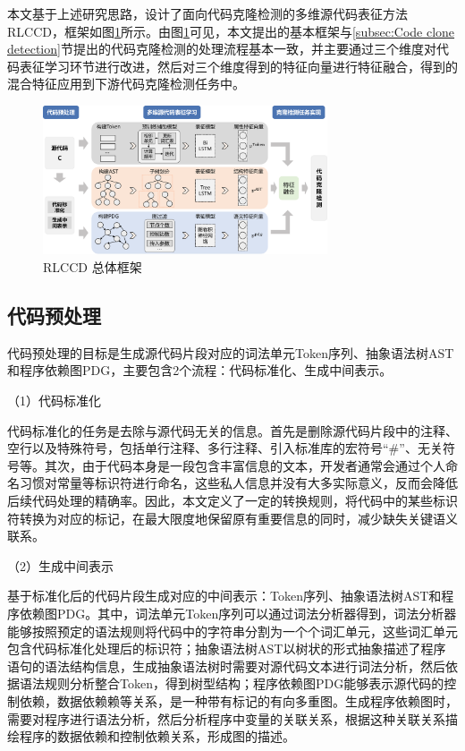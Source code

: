 本文基于上述研究思路，设计了面向代码克隆检测的多维源代码表征方法RLCCD，框架如图\ref{fig:framework}所示。由图\ref{fig:framework}可见，本文提出的基本框架与\ref{subsec:Code clone detection}节提出的代码克隆检测的处理流程基本一致，并主要通过三个维度对代码表征学习环节进行改进，然后对三个维度得到的特征向量进行特征融合，得到的混合特征应用到下游代码克隆检测任务中。

\begin{figure}[H]
    \centering
    \includegraphics[width=0.75\textwidth]{figures/framework}
    \caption{RLCCD 总体框架}
    \label{fig:framework}
\end{figure}

\subsection{代码预处理}
\label{subsec:Preprocess}
代码预处理的目标是生成源代码片段对应的词法单元Token序列、抽象语法树AST和程序依赖图PDG，主要包含2个流程：代码标准化、生成中间表示。

（1）代码标准化

代码标准化的任务是去除与源代码无关的信息。首先是删除源代码片段中的注释、空行以及特殊符号，包括单行注释、多行注释、引入标准库的宏符号“\#”、无关符号等。其次，由于代码本身是一段包含丰富信息的文本，开发者通常会通过个人命名习惯对常量等标识符进行命名，这些私人信息并没有大多实际意义，反而会降低后续代码处理的精确率。因此，本文定义了一定的转换规则，将代码中的某些标识符转换为对应的标记，在最大限度地保留原有重要信息的同时，减少缺失关键语义联系。

（2）生成中间表示

基于标准化后的代码片段生成对应的中间表示：Token序列、抽象语法树AST和程序依赖图PDG。其中，词法单元Token序列可以通过词法分析器得到，词法分析器能够按照预定的语法规则将代码中的字符串分割为一个个词汇单元，这些词汇单元包含代码标准化处理后的标识符；抽象语法树AST以树状的形式抽象描述了程序语句的语法结构信息，生成抽象语法树时需要对源代码文本进行词法分析，然后依据语法规则分析整合Token，得到树型结构；程序依赖图PDG能够表示源代码的控制依赖，数据依赖赖等关系，是一种带有标记的有向多重图。生成程序依赖图时，需要对程序进行语法分析，然后分析程序中变量的关联关系，根据这种关联关系描绘程序的数据依赖和控制依赖关系，形成图的描述。

